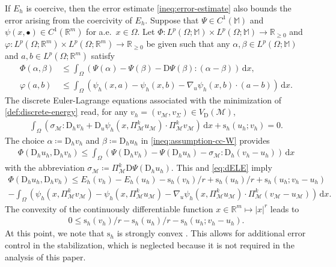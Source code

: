 \documentclass[a4paper]{amsart}
\numberwithin{equation}{section}
\newcommand{\R}{\mathbb{R}}
\renewcommand{\d}[1]{\,\mathrm{d}#1}
\newcommand{\Mcal}{\mathcal{M}}
\newcommand{\D}{\mathrm{D}}
\newcommand{\s}{\mathrm{s}}
\newcommand{\M}{\mathbb{M}}
\theoremstyle{remark}
\begin{document}
If $E_h$ is coercive, then the error estimate \eqref{ineq:error-estimate} also bounds the error arising from the coercivity of $E_h$.
Suppose that $\Psi \in C^1(\M)$ and $\psi(x,\bullet) \in C^1(\R^m)$ for a.e.~$x \in \Omega$.
Let $\Phi : L^p(\Omega;\M) \times L^p(\Omega;\M) \to \mathbb{R}_{\geq 0}$ and $\varphi: L^p(\Omega;\R^m) \times L^p(\Omega; \R^m) \to \mathbb{R}_{\geq 0}$ be given such that any $\alpha, \beta \in L^p(\Omega;\M)$ and $a, b \in L^p(\Omega;\R^m)$ satisfy
\begin{align}
	\Phi(\alpha,\beta) &\leq \int_\Omega (\Psi(\alpha) - \Psi(\beta) - \D \Psi(\beta) : (\alpha - \beta)) \d{x},\label{ineq:assumption-cc-W}\\
	\varphi(a,b) &\leq \int_\Omega (\psi_h(x,a) - \psi_h(x,b) - \nabla_u \psi_h(x,b) \cdot (a-b)) \d{x}.\label{ineq:assumption-cc-psi}
\end{align}
The discrete Euler-Lagrange equations associated with the minimization of \eqref{def:discrete-energy} read, for any $v_h = (v_\Mcal, v_\Sigma) \in V_\mathrm{D}(\Mcal)$,
\begin{align}\label{eq:dELE}
	\int_\Omega (\sigma_\Mcal : \D_h v_h + \D_u \psi_h(x,\Pi_\Mcal^k u_\Mcal) \cdot \Pi_{\Mcal}^k v_\Mcal) \d{x} + \s_h(u_h; v_h) = 0.
\end{align}
The choice
$\alpha \coloneqq \D_h v_h$ and $\beta \coloneqq \D_h u_h$ in \eqref{ineq:assumption-cc-W} provides
\begin{align*}
	\Phi(\D_h u_h, \D_h v_h) \leq \int_\Omega (\Psi(\D_h v_h) - \Psi(\D_h u_h) - \sigma_\Mcal : \D_h(v_h - u_h)) \d{x}
\end{align*}
with the abbreviation $\sigma_\Mcal \coloneqq \Pi_\Mcal^k \D \Psi(\D_h u_h)$.
This and \eqref{eq:dELE} imply
\begin{align}
	\Phi(\D_h u_h, \D_h v_h) \leq E_h(v_h) - E_h(u_h) - \s_h(v_h)/r + \s_h(u_h)/r + \s_h(u_h; v_h - u_h)\label{ineq:proof-cc-discrete}\\
	- \int_\Omega (\psi_h(x,\Pi_{\Mcal}^k v_\Mcal) - \psi_h(x,\Pi_\Mcal^k u_\Mcal) - \nabla_u \psi_h(x, \Pi_\Mcal^k u_\Mcal) \cdot \Pi_\Mcal^k(v_\Mcal - u_\Mcal)) \d{x}.\nonumber
\end{align}
The convexity of the continuously differentiable function $x \in \R^m \mapsto |x|^r$ leads to
\begin{align}\label{ineq:stabilization-convexity}
	0 \leq \s_h(v_h)/r - \s_h(u_h)/r - \s_h(u_h; v_h - u_h).
\end{align}
At this point, we note that $\s_h$ is strongly convex \cite[Lemma 5.4(e)]{CarstensenTran2022}. This allows for additional error control in the stabilization, which is neglected because it is not required in the analysis of this paper.
\end{document}
